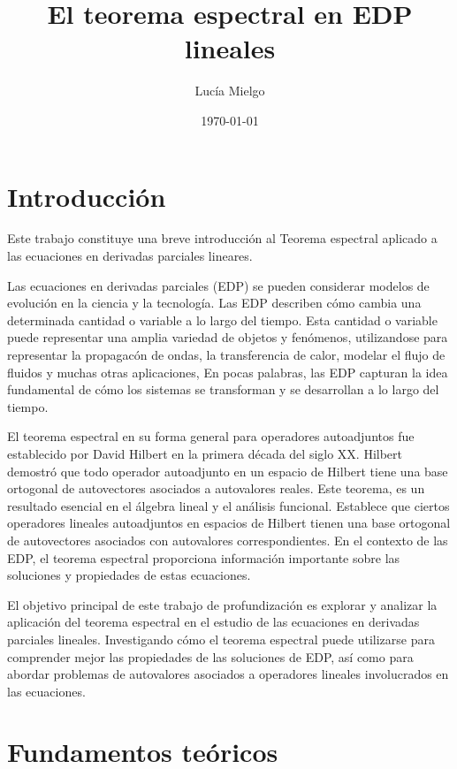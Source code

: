 \documentclass{article}
\title {\huge \textbf{El teorema espectral en EDP lineales}}
\author{Lucía Mielgo}
\date{\today}
\begin{document}
\maketitle %
\newpage

\renewcommand{\contentsname}{Índice} 
\tableofcontents
\newpage
\section{Introducción}
Este trabajo constituye una breve introducción al Teorema espectral aplicado a las ecuaciones en derivadas parciales lineares.

Las ecuaciones en derivadas parciales (EDP) se pueden considerar modelos de evolución en la ciencia y la tecnología. Las EDP describen cómo cambia una determinada cantidad o variable a lo largo del tiempo. Esta cantidad o variable puede representar una amplia variedad de objetos y fenómenos, utilizandose para representar la propagacón de ondas, la transferencia de calor, modelar el flujo de fluidos y muchas otras aplicaciones, En pocas palabras, las EDP capturan la idea fundamental de cómo los sistemas se transforman y se desarrollan a lo largo del tiempo.

El teorema espectral en su forma general para operadores autoadjuntos fue establecido por David Hilbert en la primera década del siglo XX. Hilbert demostró que todo operador autoadjunto en un espacio de Hilbert tiene una base ortogonal de autovectores asociados a autovalores reales.
Este teorema, es un resultado esencial en el álgebra lineal y el análisis funcional. Establece que ciertos operadores lineales autoadjuntos en espacios de Hilbert tienen una base ortogonal de autovectores asociados con autovalores correspondientes. En el contexto de las EDP, el teorema espectral proporciona información importante sobre las soluciones y propiedades de estas ecuaciones.

El objetivo principal de este trabajo de profundización es explorar y analizar la aplicación del teorema espectral en el estudio de las ecuaciones en derivadas parciales lineales. Investigando cómo el teorema espectral puede utilizarse para comprender mejor las propiedades de las soluciones de EDP, así como para abordar problemas de autovalores asociados a operadores lineales involucrados en las ecuaciones.

\newpage

\section{Fundamentos teóricos}
\end{document}
